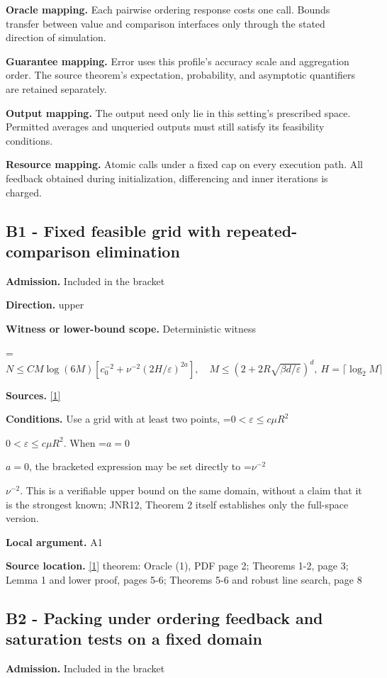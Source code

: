 \documentclass[10pt,a4paper]{article}
\newcommand{\AtlasMath}[1]{\par\begingroup\centering\setbox0=\hbox{$\displaystyle #1$}\ifdim\wd0>1.4\linewidth\typeout{ATLAS WIDE FORMULA: \the\wd0}\fi\ifdim\wd0>\linewidth\resizebox{\linewidth}{!}{\box0}\else\box0\fi\par\endgroup}
\newcommand{\AtlasInlineMath}[1]{\begingroup\setbox0=\hbox{$#1$}\ifdim\wd0>.4\linewidth\endgroup\AtlasMath{#1}\else\endgroup$#1$\fi}
\begin{document}
\textbf{Oracle mapping.} Each pairwise ordering response costs one call. Bounds transfer between value and comparison interfaces only through the stated direction of simulation.

\textbf{Guarantee mapping.} Error uses this profile's accuracy scale and aggregation order. The source theorem's expectation, probability, and asymptotic quantifiers are retained separately.

\textbf{Output mapping.} The output need only lie in this setting's prescribed space. Permitted averages and unqueried outputs must still satisfy its feasibility conditions.

\textbf{Resource mapping.} Atomic calls under a fixed cap on every execution path. All feedback obtained during initialization, differencing and inner iterations is charged.

\subsection{B1 - Fixed feasible grid with repeated-comparison elimination}
\textbf{Admission.} Included in the bracket

\textbf{Direction.} upper

\textbf{Witness or lower-bound scope.} Deterministic witness

\AtlasMath{N\le C M\log(6M)[c_0^{-2}+\nu^{-2}(2H/\varepsilon)^{2a}],\quad M\le(2+2R\sqrt{\beta d/\varepsilon})^d,\ H=\lceil\log_2 M\rceil}
\textbf{Sources.} \href{https://papers.nips.cc/paper_files/paper/2012/file/e6d8545daa42d5ced125a4bf747b3688-Paper.pdf}{[1]}

\textbf{Conditions.} Use a grid with at least two points, \AtlasInlineMath{0<\varepsilon\le c\mu R^2}. When \AtlasInlineMath{a=0}, the bracketed expression may be set directly to \AtlasInlineMath{\nu^{-2}}. This is a verifiable upper bound on the same domain, without a claim that it is the strongest known; JNR12, Theorem 2 itself establishes only the full-space version.

\textbf{Local argument.} A1

\textbf{Source location.} \href{https://papers.nips.cc/paper_files/paper/2012/file/e6d8545daa42d5ced125a4bf747b3688-Paper.pdf}{[1]} theorem: Oracle (1), PDF page 2; Theorems 1-2, page 3; Lemma 1 and lower proof, pages 5-6; Theorems 5-6 and robust line search, page 8

\subsection{B2 - Packing under ordering feedback and saturation tests on a fixed domain}
\textbf{Admission.} Included in the bracket
\end{document}
